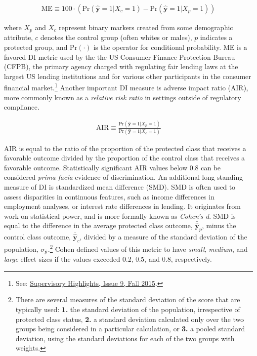 \documentclass[information,article,submit,moreauthors,pdftex]{definitions/mdpi}
\begin{document}
\begin{equation}
\label{eq:me}
\begin{aligned}
\text{ME} \equiv 100 \cdot (\text{Pr}(\hat{\mathbf{y}} = 1| X_c = 1)  - \text{Pr}(\hat{\mathbf{y}} = 1 | X_p = 1))
\end{aligned}
\end{equation}

\noindent where $X_p$ and $X_c$ represent binary markers created from some demographic attribute, $c$ denotes the control group (often whites or males), $p$ indicates a protected group, and $\text{Pr}(\cdot)$ is the operator for conditional probability.  ME is a favored DI metric used by the the US Consumer Finance Protection Bureau (CFPB), the primary agency charged with regulating fair lending laws at the largest US lending institutions and for various other participants in the consumer financial market.\footnote{See: \href{https://files.consumerfinance.gov/f/201510_cfpb_supervisory-highlights.pdf}{Supervisory Highlights, Issue 9, Fall 2015}.} Another important DI measure is adverse impact ratio (AIR), more commonly known as a \textit{relative risk ratio} in settings outside of regulatory compliance.

\begin{equation}
\label{eq:air}
\begin{aligned}
\text{AIR} \equiv \frac{\text{Pr}(\hat{\mathbf{y}} = 1 | X_p = 1)}{\text{Pr}(\hat{\mathbf{y}} = 1| X_c = 1)}
\end{aligned}
\end{equation}

\noindent AIR is equal to the ratio of the proportion of the protected class that receives a favorable outcome divided by the proportion of the control class that receives a favorable outcome. Statistically significant AIR values below 0.8 can be considered \textit{prima facia} evidence of discrimination. An additional long-standing measure of DI is standardized mean difference (SMD). SMD is often used to assess disparities in continuous features, such as income differences in employment analyses, or interest rate differences in lending. It originates from work on statistical power, and is more formally known as \textit{Cohen’s d}. SMD is equal to the difference in the average protected class outcome, $\bar{\hat{\mathbf{y}}}_p$, minus the control class outcome, $\bar{\hat{\mathbf{y}}}_c$, divided by a measure of the standard deviation of the population, $\sigma_{\hat{\mathbf{y}}}$.\footnote{There are several measures of the standard deviation of the score that are typically used: \textbf{1.} the standard deviation of the population, irrespective of protected class status, \textbf{2.} a standard deviation calculated only over the two groups being considered in a particular calculation, or \textbf{3.} a pooled standard deviation, using the standard deviations for each of the two groups with weights.} Cohen defined values of this metric to have \textit{small}, \textit{medium}, and \textit{large} effect sizes if the values exceeded 0.2, 0.5, and 0.8, respectively.  
\end{document}
